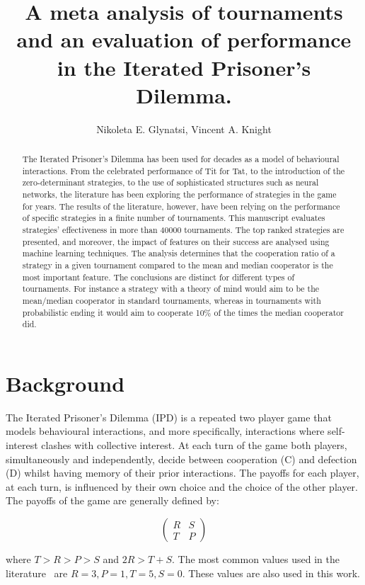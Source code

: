 \documentclass{article}
\title{A meta analysis of tournaments and an evaluation of performance in the
Iterated Prisoner's Dilemma.}
\author{Nikoleta E. Glynatsi, Vincent A. Knight}
\date{}
\newcommand{\numberofstrategies}{}
\begin{document}
\maketitle

\begin{abstract}
The Iterated Prisoner's Dilemma has been used for decades as a model of
behavioural interactions. From the celebrated performance of Tit for Tat, to the
introduction of the zero-determinant strategies, to the use of sophisticated
structures such as neural networks, the literature has been exploring the
performance of strategies in the game for years. The results of the literature,
however, have been relying on the performance of specific strategies in a finite
number of tournaments. This manuscript evaluates
\numberofstrategies strategies' effectiveness in more than 40000 tournaments.
The top ranked strategies are presented, and moreover, the impact of features on
their success are analysed using machine learning techniques. The analysis
determines that the cooperation ratio of a
strategy in a given tournament compared to the mean and median cooperator is the
most important feature. The conclusions are distinct for different types of
tournaments. For instance a strategy with a theory of mind would aim to be the mean/median
cooperator in standard tournaments, whereas in tournaments with probabilistic
ending it would aim to cooperate 10\% of the times the median cooperator did.
\end{abstract}

\section{Background}

The Iterated Prisoner's Dilemma (IPD) is a repeated two player game that models
behavioural interactions, and more specifically, interactions where
self-interest clashes with collective interest. At each turn of the game both
players, simultaneously and independently, decide between cooperation (C) and
defection (D) whilst having memory of their prior interactions. The payoffs for each
player, at each turn, is influenced by their own choice and the choice of the
other player. The payoffs of the game are generally defined by:

\[\begin{pmatrix}
R & S \\
T & P
\end{pmatrix}\]

where \(T > R > P > S\) and \(2R > T + S\). The most common values used in
the literature~\cite{Axelrod1981} are $R=3, P=1, T=5, S=0$. These values are also
used in this work.
\end{document}
